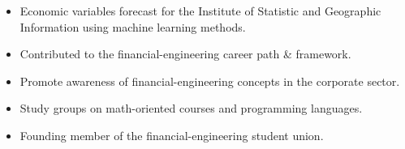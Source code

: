 \documentclass[10pt,a4paper]{altacv}
\begin{document}
\begin{itemize}
    \item Economic variables forecast for the Institute of Statistic and Geographic Information using machine learning methods. 
\end{itemize}


\medskip



\begin{itemize}
    \item Contributed to the financial-engineering career path \& framework.
    \item Promote awareness of financial-engineering concepts in the corporate sector.
    \item Study groups on math-oriented courses and programming languages. 
\end{itemize}

\begin{itemize}
    \item Founding member of the financial-engineering student union.
\end{itemize}

\medskip

\clearpage
\end{document}
